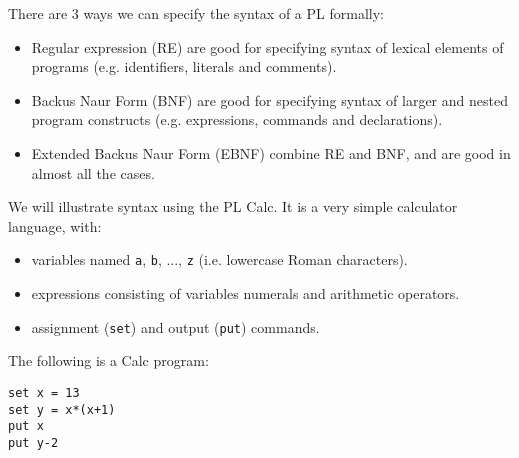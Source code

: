 \documentclass[a4paper, openany]{memoir}
\begin{document}
There are 3 ways we can specify the syntax of a PL formally:
\begin{itemize}
    \item Regular expression (RE) are good for specifying syntax of lexical elements of programs (e.g. identifiers, literals and comments).
    \item Backus Naur Form (BNF) are good for specifying syntax of larger and nested program constructs (e.g. expressions, commands and declarations).
    \item Extended Backus Naur Form (EBNF) combine RE and BNF, and are good in almost all the cases.
\end{itemize}

We will illustrate syntax using the PL Calc. It is a very simple calculator language, with:
\begin{itemize}
    \item variables named \texttt{a}, \texttt{b}, ..., \texttt{z} (i.e. lowercase Roman characters).
    \item expressions consisting of variables numerals and arithmetic operators.
    \item assignment (\texttt{set}) and output (\texttt{put}) commands.
\end{itemize}
The following is a Calc program:
\begin{lstlisting}[language=calc]
set x = 13
set y = x*(x+1)
put x
put y-2
\end{lstlisting}
\end{document}

